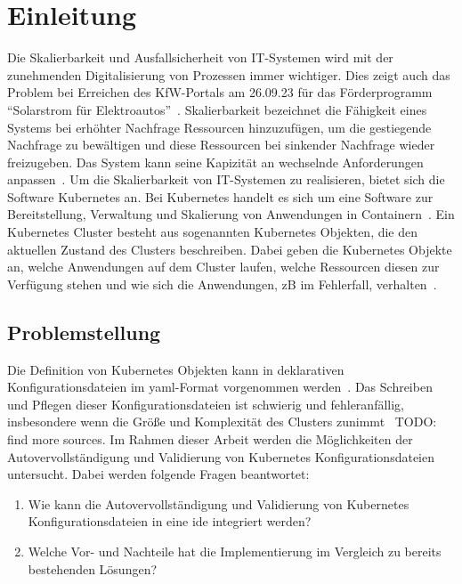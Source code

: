 \chapter{Einleitung}\label{ch:introduction}

Die Skalierbarkeit und Ausfallsicherheit von IT-Systemen wird mit der zunehmenden Digitalisierung von Prozessen immer wichtiger.
Dies zeigt auch das Problem bei Erreichen des KfW-Portals am 26.09.23 für das Förderprogramm ``Solarstrom für Elektroautos''~\cite{kfw-not-reachable}.
Skalierbarkeit bezeichnet die Fähigkeit eines Systems bei erhöhter Nachfrage Ressourcen hinzuzufügen, um die gestiegende Nachfrage zu bewältigen und
diese Ressourcen bei sinkender Nachfrage wieder freizugeben. Das System kann seine Kapizität an wechselnde Anforderungen anpassen~\cite{it-system-scaling}.
Um die Skalierbarkeit von IT-Systemen zu realisieren, bietet sich die Software Kubernetes an.
Bei Kubernetes handelt es sich um eine Software zur Bereitstellung, Verwaltung und Skalierung von Anwendungen in Containern~\cite{kubernetes-overview}.
Ein Kubernetes Cluster besteht aus sogenannten Kubernetes Objekten, die den aktuellen Zustand des Clusters beschreiben. Dabei geben die Kubernetes Objekte an,
welche Anwendungen auf dem Cluster laufen, welche Ressourcen diesen zur Verfügung stehen und wie sich die Anwendungen, \acs{zB} im Fehlerfall, verhalten~\cite{kubernetes-objects}.

\section{Problemstellung}\label{sec:problem}

Die Definition von Kubernetes Objekten kann in deklarativen Konfigurationsdateien im \acs{yaml}-Format vorgenommen werden~\cite{kubernetes-config-declarative}.
Das Schreiben und Pflegen dieser Konfigurationsdateien ist schwierig und fehleranfällig, insbesondere wenn die Größe und Komplexität des Clusters zunimmt~\cite{kubernetes-config-problems} TODO: find more sources.
Im Rahmen dieser Arbeit werden die Möglichkeiten der Autovervollständigung und Validierung von Kubernetes Konfigurationsdateien untersucht.
Dabei werden folgende Fragen beantwortet:
\begin{enumerate}
    \item Wie kann die Autovervollständigung und Validierung von Kubernetes Konfigurationsdateien in eine \acs{ide} integriert werden?
    \item Welche Vor- und Nachteile hat die Implementierung im Vergleich zu bereits bestehenden Lösungen?
\end{enumerate}

